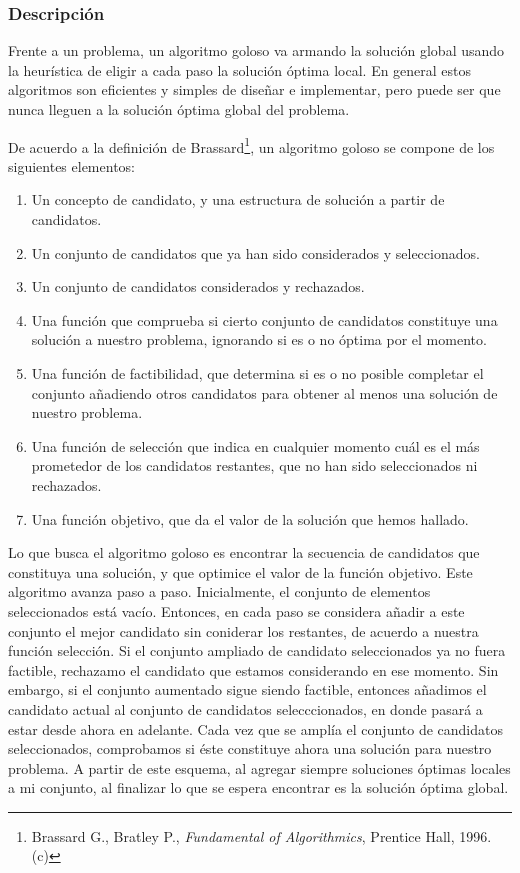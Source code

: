 \subsubsection{Descripción}

Frente a un problema, un algoritmo goloso va armando la solución global usando la heurística de eligir a cada paso la solución óptima local.
En general estos algoritmos son eficientes y simples de dise\~nar e implementar, pero puede ser que nunca lleguen a la soluci\'on \'optima global del problema. 

De acuerdo a la definici\'on de Brassard\footnote{\label{Brassard}Brassard G., Bratley P., {\it Fundamental of Algorithmics}, Prentice Hall, 1996. (c)}, un algoritmo goloso se compone de los siguientes elementos: 

\begin{enumerate}
 \item Un concepto de candidato, y una estructura de solución a partir de candidatos.
 \item Un conjunto de candidatos que ya han sido considerados y seleccionados. 
 \item Un conjunto de candidatos considerados y rechazados. 
 \item Una funci\'on que comprueba si cierto conjunto de candidatos constituye una soluci\'on a nuestro problema, ignorando si es o no \'optima por el momento. 
 \item Una funci\'on de factibilidad, que determina si es o no posible completar el conjunto a\~nadiendo otros candidatos para obtener al menos una soluci\'on de nuestro problema. 
 \item Una funci\'on de selecci\'on que indica en cualquier momento cu\'al es el m\'as prometedor de los candidatos restantes, que no han sido seleccionados ni rechazados. 
 \item Una funci\'on objetivo, que da el valor de la soluci\'on que hemos hallado. 
\end{enumerate}


Lo que busca el algoritmo goloso es encontrar la secuencia de candidatos que constituya una soluci\'on, y que optimice el valor de la funci\'on objetivo. Este algoritmo avanza paso a paso. Inicialmente, el conjunto de elementos seleccionados est\'a vac\'io. Entonces, en cada paso se considera a\~nadir a este conjunto el mejor candidato sin coniderar los restantes, de acuerdo a nuestra funci\'on selecci\'on. Si el conjunto ampliado de candidato seleccionados ya no fuera factible, rechazamo el candidato que estamos considerando en ese momento. Sin embargo, si el conjunto aumentado sigue siendo factible, entonces a\~nadimos el candidato actual al conjunto de candidatos selecccionados, en donde pasar\'a a estar desde ahora en adelante. Cada vez que se ampl\'ia el conjunto de candidatos seleccionados, comprobamos si \'este constituye ahora una soluci\'on para nuestro problema. A partir de este esquema, al agregar siempre soluciones \'optimas locales a mi conjunto, al finalizar lo que se espera encontrar es la soluci\'on \'optima global. 

